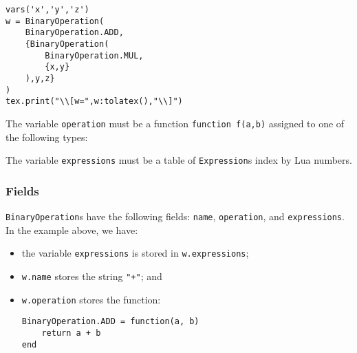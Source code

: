\documentclass{article}
\begin{document}
\begin{codebox}
\begin{verbatim}
vars('x','y','z')
w = BinaryOperation(
    BinaryOperation.ADD,
    {BinaryOperation(
        BinaryOperation.MUL,
        {x,y}
    ),y,z}
)
tex.print("\\[w=",w:tolatex(),"\\]")
\end{verbatim}
\tcblower
{}
\end{codebox}
The variable \texttt{operation} must be a function \texttt{function f(a,b)} assigned to one of the following types:
\bgroup
{}
\egroup
The variable \texttt{expressions} must be a table of \texttt{Expression}s index by Lua numbers.

\subsubsection*{Fields}

\texttt{BinaryOperation}s have the following fields: \texttt{name}, \texttt{operation}, and \texttt{expressions}. In the example above, we have:
\begin{itemize}
    \item the variable \texttt{expressions} is stored in \texttt{w.expressions};
    \item \texttt{w.name} stores the string \texttt{"+"}; and 
    \item \texttt{w.operation} stores the function:
    \begin{verbatim}
BinaryOperation.ADD = function(a, b)
    return a + b
end
    \end{verbatim}
\end{itemize}
\end{document}
